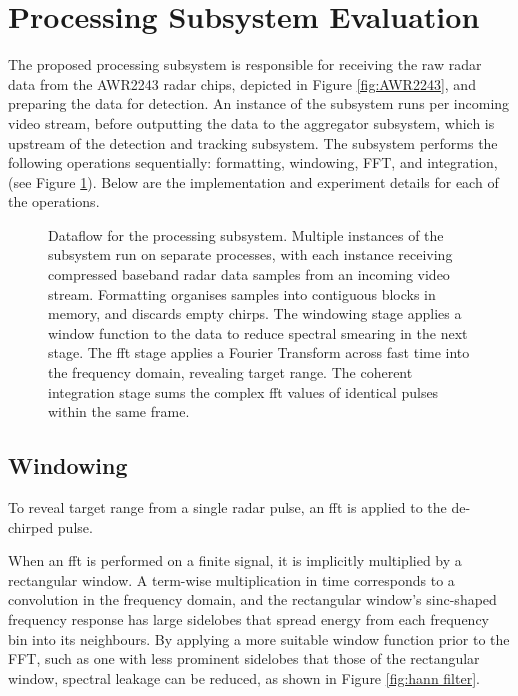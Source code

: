 \section{Processing Subsystem Evaluation}
\label{sec:processing_app}
The proposed processing subsystem is responsible for receiving the raw radar data from the AWR2243
radar chips, depicted in Figure \ref{fig:AWR2243},
and preparing the data for detection. An instance of the subsystem runs per incoming video stream,
before outputting the data to the aggregator subsystem, which is upstream of the detection and
tracking subsystem. The subsystem performs the following operations sequentially: formatting, windowing, FFT, and 
integration, (see Figure \ref{fig:preprocessing-dataflow}). Below are the implementation and 
experiment details for each of the operations. 

\begin{figure}[htbp]
    \centering
    \caption[Dataflow for the processing subsystem.]{Dataflow for the processing subsystem. Multiple instances of the subsystem run on
    separate processes, with each instance receiving compressed baseband radar data samples from an
    incoming video stream. Formatting organises samples into contiguous blocks in memory, and discards
    empty chirps. The windowing stage applies a window function to the data to reduce spectral smearing
    in the next stage. The \gls{fft} stage applies a Fourier Transform across fast time into the frequency
    domain, revealing target range. The coherent integration stage sums the complex \gls{fft} values of
    identical pulses within the same frame.} 
    \label{fig:preprocessing-dataflow}
\end{figure}

\subsection{Windowing}
To reveal target range from a single radar pulse, an \gls{fft} is applied to the
de-chirped pulse. 

When an \gls{fft} is performed on a finite signal, it is implicitly multiplied by a rectangular window.
A term-wise multiplication in time corresponds to a convolution in the frequency domain, and the
rectangular window's sinc-shaped frequency response has large sidelobes that spread energy from
each frequency bin into its neighbours. By applying a more suitable window function prior to the
FFT, such as one with less prominent sidelobes that those of the rectangular window, spectral leakage 
can be reduced, as shown in Figure \ref{fig:hann filter}.

